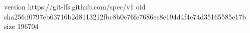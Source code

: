 version https://git-lfs.github.com/spec/v1
oid sha256:f0797cb63716b2d8113212fbc8b0e76fe7686ec8e194d4f4e74d35165585e17b
size 196704
